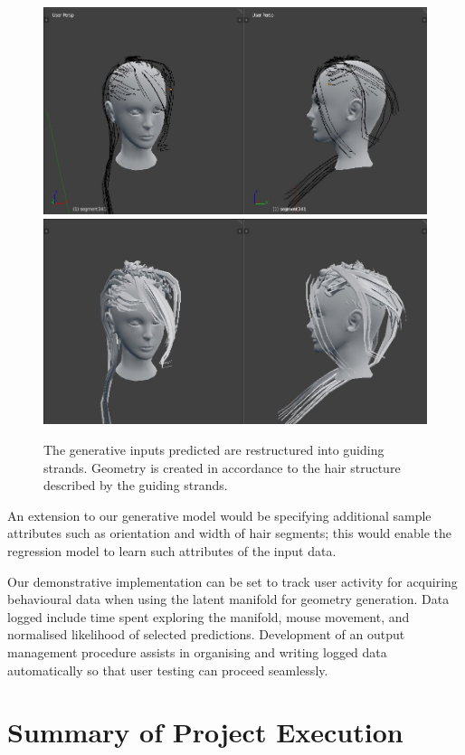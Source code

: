 \documentclass[ %
author={Dillon Keith Diep},
supervisor={Dr. Carl Henrik Ek},
degree={MEng},
title={ART-CG Hair:},
subtitle={Assisted Real-time Content Generation of Stylised Virtual Hair},
type={Research},
year={2017} ]{dissertation}
\begin{document}
\begin{figure}[!h]
	\centering
	\caption{The generative inputs predicted are restructured into guiding strands. Geometry is created in accordance to the hair structure described by the guiding strands.}
	\includegraphics[scale=0.3]{images/guidingStrands}
	\includegraphics[scale=0.3]{images/guidingExtrusion}
	\label{fig:guidingStrands}
\end{figure}

An extension to our generative model would be specifying additional sample attributes such as orientation and width of hair segments; this would enable the regression model to learn such attributes of the input data.

Our demonstrative implementation can be set to track user activity for acquiring behavioural data when using the latent manifold for geometry generation. Data logged include time spent exploring the manifold, mouse movement, and normalised likelihood of selected predictions. Development of an output management procedure assists in organising and writing logged data automatically so that user testing can proceed seamlessly.

\section{Summary of Project Execution}
\end{document}
